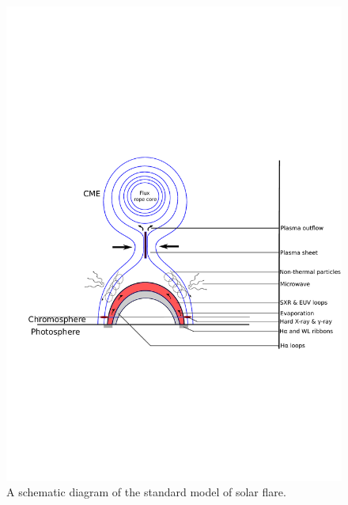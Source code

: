 \begin{figure}[ht!]
    \centering
    \hspace{5cm}
    \includegraphics[trim={1cm 8cm 0cm 8cm}, clip, width=0.95\linewidth]{Figures/std_mod.pdf}
    \caption{A schematic diagram of the standard model of solar flare.}
    \label{fig:std_mod}
\end{figure}



